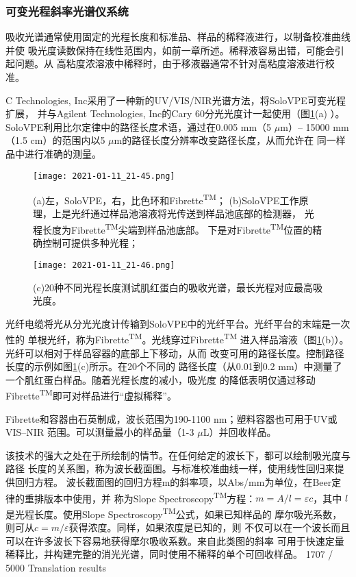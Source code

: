 \subsubsection{可变光程斜率光谱仪系统}
吸收光谱通常使用固定的光程长度和标准品、样品的稀释液进行，以制备校准曲线并使
吸光度读数保持在线性范围内，如前一章所述。稀释液容易出错，可能会引起问题。从
高粘度浓溶液中稀释时，由于移液器通常不针对高粘度溶液进行校准。

C Technologies, Inc采用了一种新的UV/VIS/NIR光谱方法，将SoloVPE可变光程扩展，
并与Agilent Technologies, Inc的Cary 60分光光度计一起使用（图\ref{fig:5.36}(a)
）。 SoloVPE利用比尔定律中的路径长度术语，通过在0.005 mm（5 $\mu$m）--
15000 mm（1.5 cm）的范围内以5 $\mu$m的路径长度分辨率改变路径长度，从而允许在
同一样品中进行准确的测量。
\begin{figure}[htpb]
    \centering
    \texttt{[image: 2021-01-11\_21-45.png]}
    \caption{(a)左，SoloVPE，右，比色环和Fibrette\textsuperscript{TM}；
    (b)SoloVPE工作原理，上是光纤通过样品池溶液将光传送到样品池底部的检测器，
    光程长度为Fibrette\textsuperscript{TM}尖端到样品池底部。
下是对Fibrette\textsuperscript{TM}位置的精确控制可提供多种光程；}
    \label{fig:5.36}
\end{figure}
\begin{figure}[t]
    \ContinuedFloat
    \texttt{[image: 2021-01-11\_21-46.png]}
    \caption{(c)20种不同光程长度测试肌红蛋白的吸收光谱，最长光程对应最高吸光度。}
\end{figure}

光纤电缆将光从分光光度计传输到SoloVPE中的光纤平台。光纤平台的末端是一次性的
单根光纤，称为Fibrette\textsuperscript{TM}。光线穿过Fibrette\textsuperscript{TM}
进入样品溶液（图\ref{fig:5.36}(b)）。光纤可以相对于样品容器的底部上下移动，从而
改变可用的路径长度。控制路径长度的示例如图\ref{fig:5.36}(c)所示。在20个不同的
路径长度（从0.01到0.2 mm）中测量了一个肌红蛋白样品。随着光程长度的减小，吸光度
的降低表明仅通过移动Fibrette\textsuperscript{TM}即可对样品进行“虚拟稀释”。

Fibrette和容器由石英制成，波长范围为190-1100 nm；塑料容器也可用于UV或VIS–NIR
范围。可以测量最小的样品量（1-3 $\mu$L）并回收样品。

该技术的强大之处在于所绘制的情节。在任何给定的波长下，都可以绘制吸光度与路径
长度的关系图，称为波长截面图。与标准校准曲线一样，使用线性回归来提供回归方程。
波长截面图的回归方程m的斜率项，以Abs/mm为单位，在Beer定律的重排版本中使用，并
称为Slope Spectroscopy\textsuperscript{TM}方程：$m = A/l =\varepsilon c$，其中
$l$是光程长度。使用Slope Spectroscopy\textsuperscript{TM}公式，如果已知样品的
摩尔吸光系数，则可从$c = m /\varepsilon$获得浓度。同样，如果浓度是已知的，则
不仅可以在一个波长而且可以在许多波长下容易地获得摩尔吸收系数。来自此类图的斜率
可用于快速定量稀释比，并构建完整的消光光谱，同时使用不稀释的单个可回收样品。
1707 / 5000
Translation results
